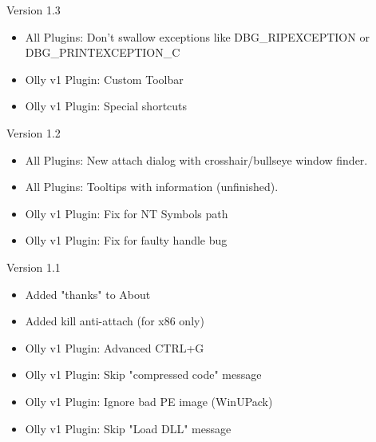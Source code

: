 \documentclass[10pt,a4paper]{article}
\begin{document}
Version 1.3
\begin{itemize}
\item All Plugins: Don't swallow exceptions like DBG\_RIPEXCEPTION or DBG\_PRINTEXCEPTION\_C
\item Olly v1 Plugin: Custom Toolbar
\item Olly v1 Plugin: Special shortcuts
\end{itemize}

Version 1.2
\begin{itemize}
\item All Plugins: New attach dialog with crosshair/bullseye window finder.
\item All Plugins: Tooltips with information (unfinished).
\item Olly v1 Plugin: Fix for NT Symbols path
\item Olly v1 Plugin: Fix for faulty handle bug
\end{itemize}

Version 1.1
\begin{itemize}
\item Added "thanks" to About
\item Added kill anti-attach (for x86 only)
\item Olly v1 Plugin: Advanced CTRL+G
\item Olly v1 Plugin: Skip "compressed code" message
\item Olly v1 Plugin: Ignore bad PE image (WinUPack)
\item Olly v1 Plugin: Skip "Load DLL" message
\end{itemize}


\end{document}
